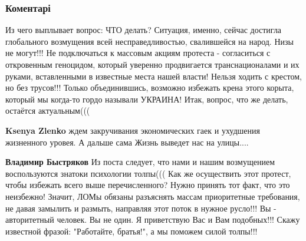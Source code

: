  
 
 
 
 
\subsubsection{Коментарі}


\begin{itemize}


Из чего выплывает вопрос: ЧТО делать? Ситуация, именно, сейчас достигла
глобального возмущения всей несправедливостью, свалившейся на народ. Низы не
могут!!! Не подключаться к массовым акциям протеста - согласиться с откровенным
геноцидом, который уверенно продвигается транснационалами и их руками,
вставленными в известные места нашей власти! Нельзя ходить с крестом, но без
трусов!!! Только объединившись, возможно избежать крена этого корыта, который
мы когда-то гордо называли УКРАИНА! Итак, вопрос, что же делать, остаётся
актуальным(((

\begin{itemize}

 
\textbf{Ksenya Zlenko} ждем закручивания экономических гаек и ухудшения жизненного уровея. А дальше сама Жизнь выведет нас на улицы....

 
\textbf{Владимир Быстряков} Из поста следует, что нами и нашим возмущением
воспользуются знатоки психологии толпы((( Как же осуществить этот протест,
чтобы избежать всего выше перечисленного? Нужно принять тот факт, что это
неизбежно! Значит, ЛОМы обязаны разъяснять массам приоритетные требования, не
давая замылить и размыть, направляя этот поток в нужное русло!!! Вы -
авторитетный человек. Вы не один. Я приветствую Вас и Вам подобных!!! Скажу
известной фразой: "Работайте, братья!", а мы поможем силой толпы!!!
\end{itemize}


\end{itemize}
